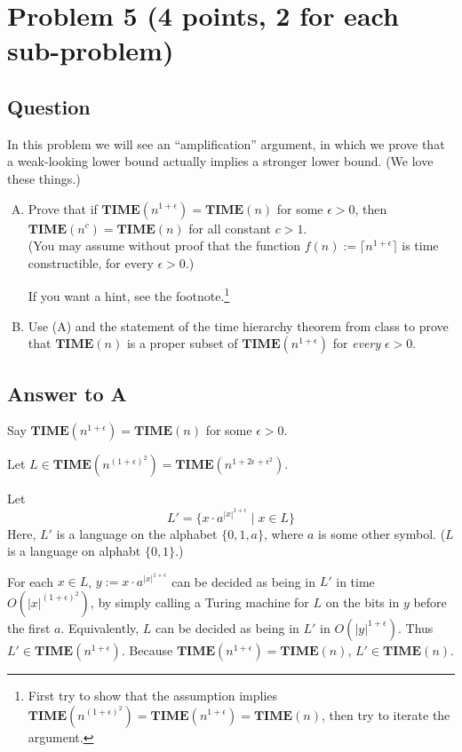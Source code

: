 \documentclass{article}
\newcommand{\TIME}{\mathbf{TIME}}
\begin{document}
	\section*{Problem 5 (4 points, 2 for each sub-problem)}
	
	\subsection*{Question}

	In this problem we will see an ``amplification'' argument, in which we prove that a weak-looking lower bound actually implies a stronger lower bound. (We love these things.)
	
	\begin{enumerate}[(A)]
		\item Prove that if $\TIME(n^{1+\epsilon})=\TIME(n)$ for some $\epsilon>0$, then $\TIME(n^c) = \TIME(n)$ for all constant $c >1$.\\ 
		(You may assume without proof that the function $f(n) := \lceil n^{1+\epsilon} \rceil$ is time constructible, for every $\epsilon > 0$.)
		
		If you want a hint, see the footnote.\footnote{\tiny First try to show that the assumption implies $\TIME(n^{(1+\epsilon)^2})=\TIME(n^{1+\epsilon}) = \TIME(n)$, then try to iterate the argument.}
		
		\item  Use (A) and the statement of the time hierarchy theorem from class to prove that $\TIME(n)$ is a proper subset of $\TIME(n^{1+\epsilon})$ for \emph{every} $\epsilon > 0$.
	\end{enumerate}
	
	\subsection*{Answer to A}
	Say $\TIME(n^{1+\epsilon}) = \TIME(n)$ for some $\epsilon > 0$.  

	Let $L \in \TIME(n^{(1 + \epsilon)^2}) = \TIME(n^{1 + 2\epsilon + \epsilon^2})$.

	Let
	$$
	L' = \{x \cdot a^{|x|^{1 + \epsilon}} \mid x \in L\}
	$$
	Here, $L'$ is a language on the alphabet $\{0, 1, a\}$, where $a$ is some other symbol.  ($L$ is a language on alphabt $\{0, 1\}$.)

	For each $x \in L$, $y := x \cdot a^{|x|^{1 + \epsilon}}$ can be decided as being in $L'$ in time $O(|x|^{(1 + \epsilon)^2})$, by simply calling a Turing machine for $L$ on the bits in $y$ before the first $a$.  Equivalently, $L$ can be decided as being in $L'$ in $O(|y|^{1 + \epsilon})$.  Thus $L' \in \TIME(n^{1 + \epsilon})$.  Because $\TIME(n^{1 + \epsilon}) = \TIME(n)$, $L' \in \TIME(n)$.
\end{document}
